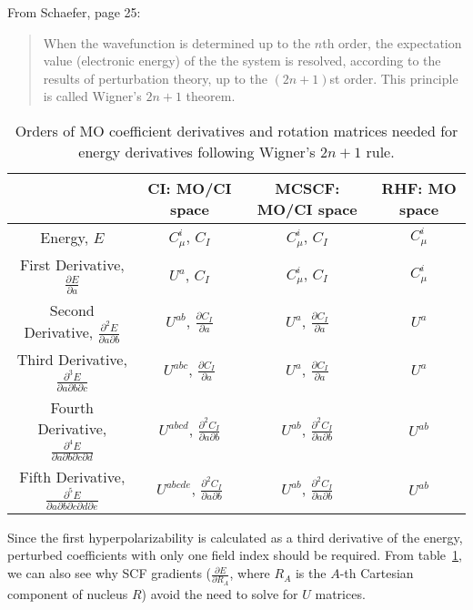 From Schaefer, page 25:
\begin{quote}
  When the wavefunction is determined up to the \(n\)th order, the expectation value (electronic energy) of the the system is resolved, according to the results of perturbation theory, up to the \((2n+1)\)st order. This principle is called Wigner's \(2n+1\) theorem\cite{doi:10.1063/1.1668053,EPSTEIN1980311}.
\end{quote}
\begin{table}
  \caption[MO coefficient derivatives and rotation matrices needed for energy derivatives]{Orders of MO coefficient derivatives and rotation matrices needed for energy derivatives following Wigner's \(2n+1\) rule.}
  \label{tutorial:tab:wigner}
  \begin{tabular}{cccc}
    \toprule
    & CI: MO/CI space & MCSCF: MO/CI space & RHF: MO space \\
    \midrule
    Energy, \(E\) & \(C_{\mu}^{i}\), \(C_{I}\) & \(C_{\mu}^{i}\), \(C_{I}\) & \(C_{\mu}^{i}\) \\
    First Derivative, \(\frac{\partial E}{\partial a}\) & \(U^{a}\), \(C_{I}\) & \(C_{\mu}^{i}\), \(C_{I}\) & \(C_{\mu}^{i}\) \\
    Second Derivative, \(\frac{\partial^{2} E}{\partial a \partial b}\) & \(U^{ab}\), \(\frac{\partial C_{I}}{\partial a}\) & \(U^{a}\), \(\frac{\partial C_{I}}{\partial a}\) & \(U^{a}\) \\
    Third Derivative, \(\frac{\partial^{3} E}{\partial a \partial b \partial c}\) & \(U^{abc}\), \(\frac{\partial C_{I}}{\partial a}\) & \(U^{a}\), \(\frac{\partial C_{I}}{\partial a}\) & \(U^{a}\) \\
    Fourth Derivative, \(\frac{\partial^{4} E}{\partial a \partial b \partial c \partial d}\) & \(U^{abcd}\), \(\frac{\partial^{2} C_{I}}{\partial a \partial b}\) & \(U^{ab}\), \(\frac{\partial^{2} C_{I}}{\partial a \partial b}\) & \(U^{ab}\) \\
    Fifth Derivative, \(\frac{\partial^{5} E}{\partial a \partial b \partial c \partial d \partial e}\) & \(U^{abcde}\), \(\frac{\partial^{2} C_{I}}{\partial a \partial b}\) & \(U^{ab}\), \(\frac{\partial^{2} C_{I}}{\partial a \partial b}\) & \(U^{ab}\) \\
    \bottomrule
  \end{tabular}
\end{table}
Since the first hyperpolarizability is calculated as a third derivative of the energy, perturbed coefficients with only one field index should be required. From table~\ref{tutorial:tab:wigner}, we can also see why SCF gradients (\(\frac{\partial E}{\partial R_A}\), where \(R_A\) is the \(A\)-th Cartesian component of nucleus \(R\)) avoid the need to solve for \(U\) matrices.

